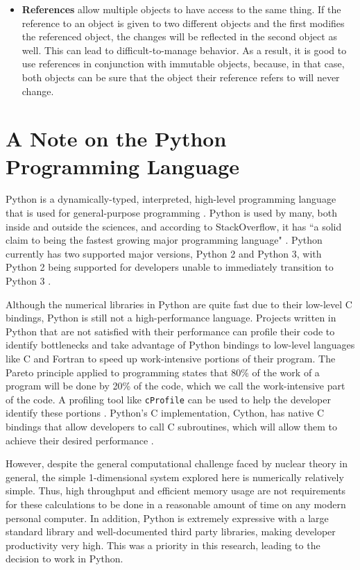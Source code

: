 \begin{itemize}
    \item \textbf{References} allow multiple objects to have access to the same thing. If the reference to an object is given to two different objects and the first modifies the referenced object, the changes will be reflected in the second object as well. This can lead to difficult-to-manage behavior. As a result, it is good to use references in conjunction with immutable objects, because, in that case, both objects can be sure that the object their reference refers to will never change.
\end{itemize}


\section{A Note on the Python Programming Language}

Python is a dynamically-typed, interpreted, high-level programming language that is used for general-purpose programming \cite{oliphant2007python}. Python is used by many, both inside and outside the sciences, and according to StackOverflow, it has ``a solid claim to being the fastest growing major programming language" \cite{PythonGrowth}. Python currently has two supported major versions, Python 2 and Python 3, with Python 2 being supported for developers unable to immediately transition to Python 3 \cite{Python2EOL}.

Although the numerical libraries in Python are quite fast due to their low-level C bindings, Python is still not a high-performance language. Projects written in Python that are not satisfied with their performance can profile their code to identify bottlenecks and take advantage of Python bindings to low-level languages like C and Fortran to speed up work-intensive portions of their program. The Pareto principle applied to programming states that 80\% of the work of a program will be done by 20\% of the code, which we call the work-intensive part of the code. A profiling tool like \texttt{cProfile} can be used to help the developer identify these portions \cite{cProfile}. Python's C implementation, Cython, has native C bindings that allow developers to call C subroutines, which will allow them to achieve their desired performance \cite{behnel2011cython}.

However, despite the general computational challenge faced by nuclear theory in general, the simple 1-dimensional system explored here is numerically relatively simple. Thus, high throughput and efficient memory usage are not requirements for these calculations to be done in a reasonable amount of time on any modern personal computer. In addition, Python is extremely expressive with a large standard library and well-documented third party libraries, making developer productivity very high. This was a priority in this research, leading to the decision to work in Python.

